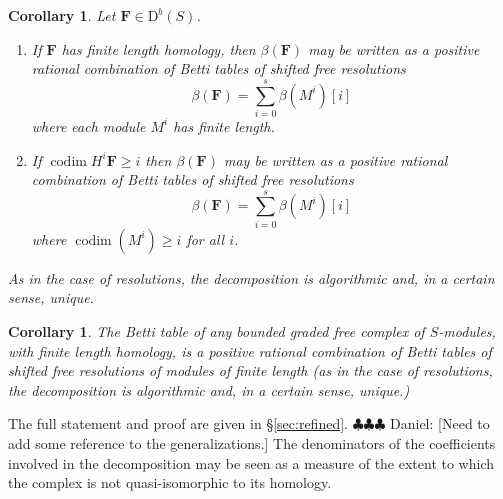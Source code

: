 \documentclass[12pt]{amsart}
\newtheorem{cor}[lemma]{Corollary}
\theoremstyle{definition}
\theoremstyle{remark}
\newcommand{\codim}{\operatorname{codim}}
\newcommand{\FF}{\mathbf{F}}
\newcommand{\DD}{\mathrm{D}}
\newcommand{\daniel}[1]{{\color{green} \sf $\clubsuit\clubsuit\clubsuit$ Daniel: [#1]}}
\begin{document}
\begin{cor}\label{cor:decompose}
Let $\FF\in \DD^b(S)$.
\begin{enumerate}
	\item  If $\FF$ has finite length homology, then $\beta(\FF)$ may be written as a positive rational combination of Betti tables of shifted free resolutions
	\[\beta(\FF)=\sum_{i=0}^s \beta(M^i)[i]\]
	 where each module $M^i$ has finite length.
	\item  If $\codim H^i\FF\geq i$ then $\beta(\FF)$ may be written as a positive rational combination of Betti tables of shifted free resolutions
\[\beta(\FF)=\sum_{i=0}^s \beta(M^i)[i]\]
where $\codim(M^i)\geq i$ for all $i$.
\end{enumerate}
As in the case of resolutions, the decomposition is algorithmic and, in a certain sense, unique.	
\end{cor}
\begin{cor}\label{cor:decompose}
The Betti table of any bounded graded free complex of $S$-modules, with finite length homology, is a positive rational combination of Betti tables of shifted free resolutions of modules of finite length (as in the case of resolutions, the decomposition is algorithmic and, in a certain sense, unique.)
\end{cor}

The full statement and proof are given in \S\ref{sec:refined}.  \daniel{Need to add some reference to the generalizations.}  The denominators of the coefficients involved in the decomposition may be seen as a measure of the extent to which the complex is not quasi-isomorphic to its homology. 
\end{document}
